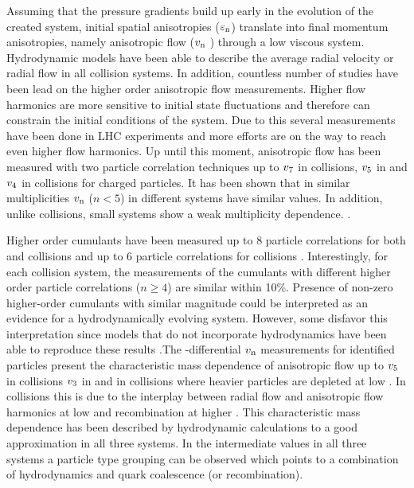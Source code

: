 \documentclass[../report.tex]{subfiles}
\newcommand{\vthree}{\ensuremath{v_{\rm 3}\Xspace} }
\newcommand{\vfour}{\ensuremath{v_{\rm 4}\Xspace} }
\newcommand{\vfive}{\ensuremath{v_{\rm 5}\Xspace} }
\newcommand{\vseven}{\ensuremath{v_{\rm 7}\Xspace} }
\newcommand{\vn}{\ensuremath{v_{\rm n}\Xspace} }
\begin{document}
Assuming that the pressure gradients build up early in the evolution of the created system, initial spatial anisotropies ($\varepsilon_{\rm{n}}$) translate into final momentum anisotropies, namely anisotropic flow (\vn) through a low viscous system. Hydrodynamic models have been able to describe the average radial velocity or radial flow in all collision systems. In addition, countless number of studies have been lead on the higher order anisotropic flow measurements. Higher flow harmonics are more sensitive to initial state fluctuations and therefore can constrain the initial conditions of the system. Due to this several measurements have been done in LHC experiments and more efforts are on the way to reach even higher flow harmonics. Up until this moment, anisotropic flow has been measured with two particle correlation techniques up to \vseven in \PbPb collisions, \vfive in \pPb and \vfour in \pp collisions for charged particles. It has been shown that in similar multiplicities \vn ($n<5$) in different systems have similar values. In addition, unlike \PbPb collisions, small systems show a weak multiplicity dependence. \cite{CMS:2012qk,Abelev:2012ola,Aad:2012gla,Aamodt:2011by,Chatrchyan:2011eka,Chatrchyan:2012wg,ATLAS:2012at,Aad:2014lta,Aad:2015gqa,CMS:2015zpa,Khachatryan:2016txc,Acharya:2017ino,Adam:2016ows,Adam:2016nfo,Acharya:2018zuq,Sirunyan:2017uyl,Aaboud:2017acw}.

Higher order cumulants have been measured up to 8 particle correlations for both \PbPb and \pPb collisions and up to 6 particle correlations for \pp collisions \cite{Aad:2013fja,Chatrchyan:2013nka,Khachatryan:2016txc,Aamodt:2010pa,ALICE:2011ab,Chatrchyan:2012ta,Abelev:2014mda,Chatrchyan:2013kba,Aad:2014vba,Khachatryan:2015waa,Adam:2016izf,CMS:2015ica,Sirunyan:2017pan,Sirunyan:2017igb,Aaboud:2017acw,Aaboud:2017blb}. Interestingly, for each collision system, the measurements of the cumulants with different higher order particle correlations ($n \geq 4$) are similar within 10\%. Presence of non-zero higher-order cumulants with similar magnitude could be interpreted as an evidence for a hydrodynamically evolving system. However, some disfavor this interpretation since models that do not incorporate hydrodynamics have been able to reproduce these results \cite{Sjostrand:2006za,Jia:2014pza,Gyulassy:2014cfa,McLerran:2014uka}.The \pT-differential \vn measurements for identified particles present the characteristic mass dependence of anisotropic flow up to \vfive in \PbPb collisions \vthree in \pPb and \vtwo in \pp collisions where heavier particles are depleted at low \pt \cite{Abelev:2014pua,Abelev:2012di,Adam:2016nfo,Khachatryan:2014jra,ABELEV:2013wsa,CMS:2015kua,Khachatryan:2016txc,Acharya:2018zuq}. In \PbPb collisions this is due to the interplay between radial flow and anisotropic flow harmonics at low \pT and recombination at higher \pT. This characteristic mass dependence has been described by hydrodynamic calculations to a good approximation in all three systems. In the intermediate \pT values in all three systems a particle type grouping can be observed which points to a combination of hydrodynamics and quark coalescence (or recombination).
\end{document}
